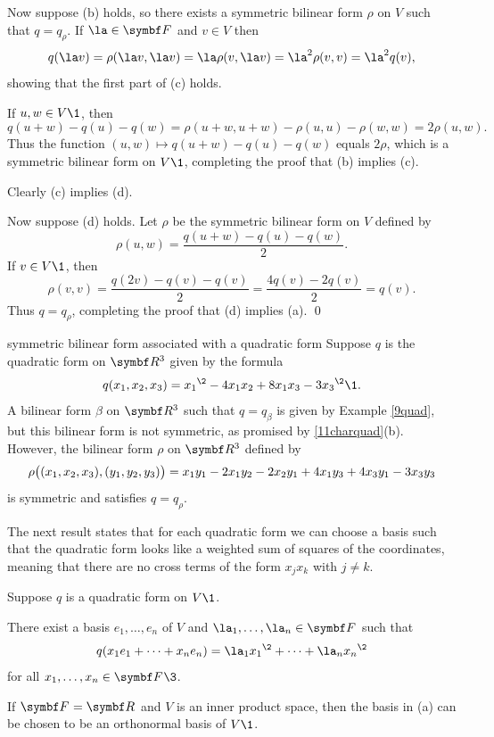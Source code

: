 Now suppose (b) holds, so there exists a symmetric bilinear form $\rho$ on $V$ such that $q = q_\rho$. If $\la \in \F{}$ and $v \in V$ then
\[
q(\la v) = \rho(\la v, \la v) = \la \rho(v, \la v) = \la^2 \rho(v, v) = \la^2 q(v),
\]
showing that the first part of (c) holds.

If $u, w \in V\1$, then
\[
q(u+w) - q(u) - q(w) = \rho(u+w, u+ w) - \rho(u, u) - \rho(w, w) = 2 \rho(u, w).
\]
Thus the function $(u, w) \mapsto q(u+w) - q(u) - q(w)$ equals $2\rho$, which is a symmetric bilinear form on $V\1$, completing the proof that (b) implies (c).

Clearly (c) implies (d).

Now suppose (d) holds. Let $\rho$ be the symmetric bilinear form on $V$ defined by
\[
\rho(u, w) = \frac{ q(u+w) - q(u) - q(w) }{2}.
\]
If $v \in V\1$, then
\vspace{-.09in} %
\[
\rho(v,v) =  \frac{ q(2v) - q(v) - q(v) }{2} = \frac{4q(v) - 2q(v)}{2} = q(v).
\]
Thus $q = q_\rho$, completing the proof that (d) implies (a).
\qed

\pagebreak[3]

\begin{example}{symmetric bilinear form associated with a quadratic form}
Suppose $q$ is the quadratic form on $\R3$ given by the formula
 \[
 q(x_1, x_2, x_3) = {x_1}^{\2} - 4 x_1 x_2 +8 x_1 x_3 - 3{x_3}^{\2}\1.
 \]
 A bilinear form $\beta$ on $\R3$ such that $q = q_\beta$ is given by Example \ref{9quad}, but this bilinear form is not symmetric, as promised by \ref{11charquad}(b). However, the bilinear form $\rho$ on $\R3$ defined by
 \[
 \rho\paren[\big]{(x_1, x_2,x_3), (y_1, y_2, y_3)} =  x_1 y_1 - 2 x_1 y_2  - 2 x_2 y_1 + 4x_1 y_3 + 4x_3 y_1- 3x_3 y_3
 \]
 is symmetric and satisfies $q = q_\rho$.
\end{example}

The next result states that for each quadratic form we can choose a basis such that the quadratic form looks like a weighted sum of squares of the coordinates, meaning that there are no cross terms of the form $x_j x_k$ with $j \ne k$.

{Suppose $q$ is a quadratic form on $V\1$.
\begin{subtheorem}
\item
There exist a basis $e_1, \ldots, e_n$ of $V$ and $\la_1, \ldots, \la_n \in \F{}$ such that
\[
q( x_1 e_1 + \cdots + x_n e_n ) = \la_1 {x_1}^{\2} + \cdots + \la_n {x_n}^{\2}
\]
for all $x_1, \ldots, x_n \in \F{}\3$.
\item
If $\F{} = \R{}$ and $V$ is an inner product space, then the basis in (a) can be chosen to be an orthonormal basis of $V\1$.
\end{subtheorem}}

